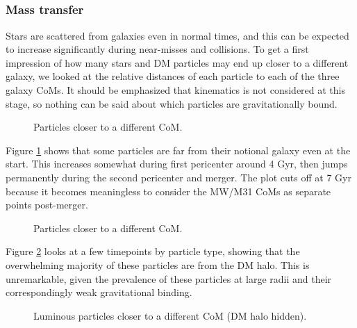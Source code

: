 \documentclass[twocolumn]{aastex63}
\newcommand{\todo}{\color{red}{TODO}\color{black}\hspace{2mm}}
\begin{document}
\todo{identify, trace history, trace fate}\ 

\todo{Jacobi radius}\ 

\todo{Tail kinematics: $\sigma$, energy}\ 

\todo{Lifetime of tails}\ 



\subsubsection{Mass transfer}

Stars are scattered from galaxies even in normal times, and this can be expected to increase significantly during near-misses and collisions. To get a first impression of how many stars and DM particles may end up closer to a different galaxy, we looked at the relative distances of each particle to each of the three galaxy CoMs. It should be emphasized that kinematics is not considered at this stage, so nothing can be said about which particles are gravitationally bound.

\begin{figure}[htb!]
	\caption{Particles closer to a different CoM.
		\label{fig:trans_count}}
\end{figure}

Figure \ref{fig:trans_count} shows that some particles are far from their notional galaxy even at the start. This increases somewhat during first pericenter around 4 Gyr, then jumps permanently during the second pericenter and merger. The plot cuts off at 7 Gyr because it becomes meaningless to consider the MW/M31 CoMs as separate points post-merger.

\begin{figure}[htb!]
	\caption{Particles closer to a different CoM.
		\label{fig:trans_p}}
\end{figure}

Figure \ref{fig:trans_p} looks at a few timepoints by particle type, showing that the overwhelming majority of these particles are from the DM halo. This is unremarkable, given the prevalence of these particles at large radii and their correspondingly weak gravitational binding.

\begin{figure}[htb!]
	\caption{Luminous particles closer to a different CoM (DM halo hidden).
		\label{fig:trans_l}}
\end{figure}
\end{document}
